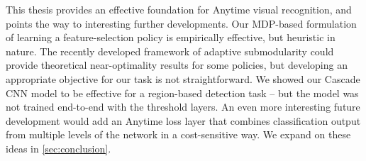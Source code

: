 This thesis provides an effective foundation for Anytime visual recognition, and points the way to interesting further developments.
Our MDP-based formulation of learning a feature-selection policy is empirically effective, but heuristic in nature.
The recently developed framework of adaptive submodularity \parencite{Golovin-and-Krause-2010-JAIR} could provide theoretical near-optimality results for some policies, but developing an appropriate objective for our task is not straightforward.
We showed our Cascade CNN model to be effective for a region-based detection task -- but the model was not trained end-to-end with the threshold layers.
An even more interesting future development would add an Anytime loss layer that combines classification output from multiple levels of the network in a cost-sensitive way.
We expand on these ideas in \autoref{sec:conclusion}.
